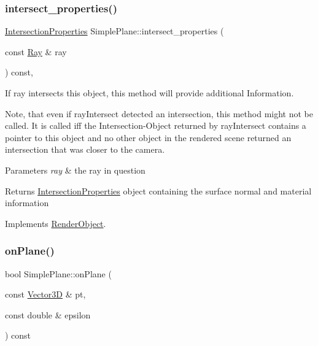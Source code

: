 \subsubsection{\texorpdfstring{intersect\_properties()}{intersect\_properties()}}
{\footnotesize\ttfamily \mbox{\hyperlink{classIntersectionProperties}{Intersection\+Properties}} Simple\+Plane\+::intersect\+\_\+properties (\begin{DoxyParamCaption}\item[{const \mbox{\hyperlink{classRay}{Ray}} \&}]{ray }\end{DoxyParamCaption}) const\hspace{0.3cm}{\ttfamily [override]}, {\ttfamily [virtual]}}



If ray intersects this object, this method will provide additional Information. 

Note, that even if ray\+Intersect detected an intersection, this method might not be called. It is called iff the Intersection-\/\+Object returned by ray\+Intersect contains a pointer to this object and no other object in the rendered scene returned an intersection that was closer to the camera.


\begin{DoxyParams}{Parameters}
{\em ray} & the ray in question \\
\hline
\end{DoxyParams}
\begin{DoxyReturn}{Returns}
\mbox{\hyperlink{classIntersectionProperties}{Intersection\+Properties}} object containing the surface normal and material information 
\end{DoxyReturn}


Implements \mbox{\hyperlink{classRenderObject_a792d36570e3264530872187ca1b0baca}{Render\+Object}}.

\mbox{\label{classSimplePlane_af7bd46c5bb092902a42696d2962f94d3}} 
\subsubsection{\texorpdfstring{onPlane()}{onPlane()}}
{\footnotesize\ttfamily bool Simple\+Plane\+::on\+Plane (\begin{DoxyParamCaption}\item[{const \mbox{\hyperlink{classVector3D}{Vector3D}} \&}]{pt,  }\item[{const double \&}]{epsilon }\end{DoxyParamCaption}) const\hspace{0.3cm}{\ttfamily [virtual]}}



